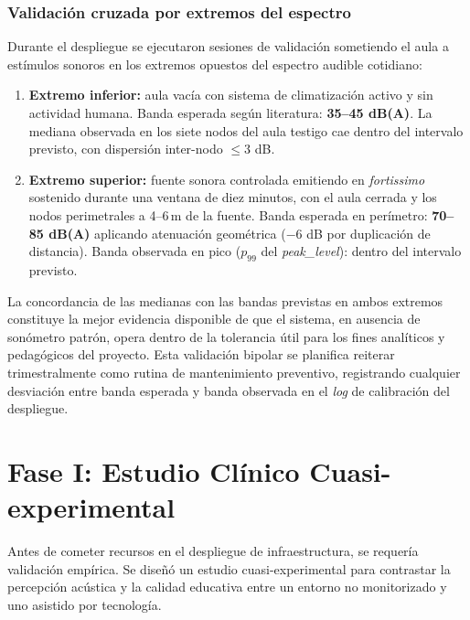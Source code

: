 \documentclass[11pt,a4paper]{article}
\begin{document}
\subsubsection{Validación cruzada por extremos del espectro}
Durante el despliegue se ejecutaron sesiones de validación sometiendo el aula a estímulos sonoros en los extremos opuestos del espectro audible cotidiano:

\begin{enumerate}
    \item \textbf{Extremo inferior:} aula vacía con sistema de climatización activo y sin actividad humana. Banda esperada según literatura: \textbf{35--45 dB(A)}. La mediana observada en los siete nodos del aula testigo cae dentro del intervalo previsto, con dispersión inter-nodo $\leq 3$ dB.
    \item \textbf{Extremo superior:} fuente sonora controlada emitiendo en \textit{fortissimo} sostenido durante una ventana de diez minutos, con el aula cerrada y los nodos perimetrales a 4--6\,m de la fuente. Banda esperada en perímetro: \textbf{70--85 dB(A)} aplicando atenuación geométrica ($-6$ dB por duplicación de distancia). Banda observada en pico ($p_{99}$ del \textit{peak\_level}): dentro del intervalo previsto.
\end{enumerate}

La concordancia de las medianas con las bandas previstas en ambos extremos constituye la mejor evidencia disponible de que el sistema, en ausencia de sonómetro patrón, opera dentro de la tolerancia útil para los fines analíticos y pedagógicos del proyecto. Esta validación bipolar se planifica reiterar trimestralmente como rutina de mantenimiento preventivo, registrando cualquier desviación entre banda esperada y banda observada en el \textit{log} de calibración del despliegue.

\section{Fase I: Estudio Clínico Cuasi-experimental}

Antes de cometer recursos en el despliegue de infraestructura, se requería validación empírica. Se diseñó un estudio cuasi-experimental para contrastar la percepción acústica y la calidad educativa entre un entorno no monitorizado y uno asistido por tecnología.
\end{document}
